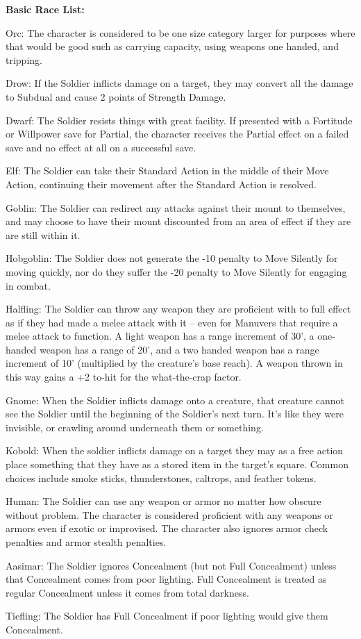 \textbf{Basic Race List:}
\begin{description*}
\item[Orc:] The character is considered to be one size category larger for purposes where that would be good such as carrying capacity, using weapons one handed, and tripping.
\item[Drow:] If the Soldier inflicts damage on a target, they may convert all the damage to Subdual and cause 2 points of Strength Damage.
\item[Dwarf:] The Soldier resists things with great facility. If presented with a Fortitude or Willpower save for Partial, the character receives the Partial effect on a failed save and no effect at all on a successful save.
\item[Elf:] The Soldier can take their Standard Action in the middle of their Move Action, continuing their movement after the Standard Action is resolved.
\item[Goblin:] The Soldier can redirect any attacks against their mount to themselves, and may choose to have their mount discounted from an area of effect if they are are still within it.
\item[Hobgoblin:] The Soldier does not generate the -10 penalty to Move Silently for moving quickly, nor do they suffer the -20 penalty to Move Silently for engaging in combat.
\item[Halfling:] The Soldier can throw any weapon they are proficient with to full effect as if they had made a melee attack with it – even for Manuvers that require a melee attack to function. A light weapon has a range increment of 30', a one-handed weapon has a range of 20', and a two handed weapon has a range increment of 10' (multiplied by the creature's base reach). A weapon thrown in this way gains a +2 to-hit for the what-the-crap factor.
\item[Gnome:] When the Soldier inflicts damage onto a creature, that creature cannot see the Soldier until the beginning of the Soldier's next turn. It's like they were invisible, or crawling around underneath them or something.
\item[Kobold:] When the soldier inflicts damage on a target they may as a free action place something that they have as a stored item in the target's square. Common choices include smoke sticks, thunderstones, caltrops, and feather tokens.
\item[Human:] The Soldier can use any weapon or armor no matter how obscure without problem. The character is considered proficient with any weapons or armors even if exotic or improvised. The character also ignores armor check penalties and armor stealth penalties.
\item[Aasimar:] The Soldier ignores Concealment (but not Full Concealment) unless that Concealment comes from poor lighting. Full Concealment is treated as regular Concealment unless it comes from total darkness.
\item[Tiefling:] The Soldier has Full Concealment if poor lighting would give them Concealment.
\end{description*}


